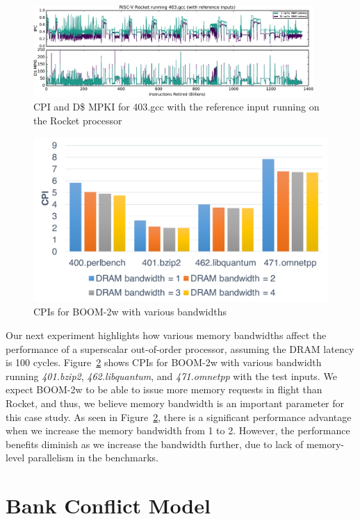 \begin{figure}
	\centering
	\includegraphics[width=0.95\textwidth]{figures/403-gcc-ref.pdf}
	\caption{CPI and D\$ MPKI for 403.gcc with the reference input running on the Rocket processor}
	\label{fig:gcc_ref}
\end{figure}

\begin{figure}[t]
	\centering
	\includegraphics[width=0.8\columnwidth]{figures/boom-bw.pdf}
	\caption{CPIs for BOOM-2w with various bandwidths}
	\label{fig:bandwidths}
\end{figure}

Our next experiment highlights how various memory bandwidths affect the performance of
a superscalar out-of-order processor, assuming the DRAM latency is 100 cycles.
Figure~\ref{fig:bandwidths} shows CPIs for BOOM-2w with various bandwidth 
running \textit{401.bzip2}, \textit{462.libquantum}, and \textit{471.omnetpp}
with the test inputs.
We expect BOOM-2w to be able to issue more memory requests in flight than Rocket,
and thus, we believe memory bandwidth is an important parameter for this case study.
As seen in Figure~\ref{fig:bandwidths}, there is a significant performance
advantage when we increase the memory bandwidth from 1 to 2. However,
the performance benefits diminish as we increase the bandwidth further,
due to lack of memory-level parallelism in the benchmarks.

\section{Bank Conflict Model}

